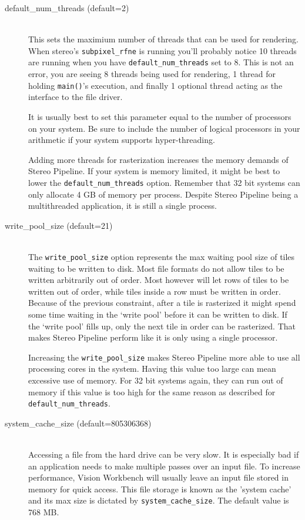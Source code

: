 \newpage
\begin{description}

\item[default\_num\_threads \textnormal (default=2)] \hfill \\
This sets the maximium number of threads that can be used for
rendering. When stereo's \texttt{subpixel\_rfne} is running you'll
probably notice 10 threads are running when you have
\texttt{default\_num\_threads} set to 8. This is not an error, you are
seeing 8 threads being used for rendering, 1 thread for holding
\texttt{main()}'s execution, and finally 1 optional thread acting as the
interface to the file driver.

It is usually best to set this parameter equal to the number of
processors on your system. Be sure to include the number of logical
processors in your arithmetic if your system supports hyper-threading.

Adding more threads for rasterization increases the memory demands of
Stereo Pipeline. If your system is memory limited, it might be best to
lower the \texttt{default\_num\_threads} option. Remember that 32 bit
systems can only allocate 4 GB of memory per process. Despite Stereo
Pipeline being a multithreaded application, it is still a single
process.

\item[write\_pool\_size \textnormal (default=21)] \hfill \\
The \texttt{write\_pool\_size} option represents the max waiting pool
size of tiles waiting to be written to disk. Most file formats do not
allow tiles to be written arbitrarily out of order. Most however will
let rows of tiles to be written out of order, while tiles inside a row
must be written in order. Because of the previous constraint, after a
tile is rasterized it might spend  some time waiting in the `write
pool' before it can be written to disk. If the `write pool' fills up,
only the next tile in order can be rasterized. That makes Stereo
Pipeline perform like it is only using a single processor.

Increasing the \texttt{write\_pool\_size} makes Stereo Pipeline more
able to use all processing cores in the system. Having this value too
large can mean excessive use of memory. For 32 bit systems again, they
can run out of memory if this value is too high for the same reason as
described for \texttt{default\_num\_threads}.

\item[system\_cache\_size \textnormal (default=805306368)] \hfill \\
Accessing a file from the hard drive can be very slow. It is especially
bad if an application needs to make multiple passes over an input
file. To increase performance, Vision Workbench will usually leave an
input file stored in memory for quick access. This file storage is
known as the 'system cache' and its max size is dictated by
\texttt{system\_cache\_size}. The default value is 768 MB.


\end{description}
